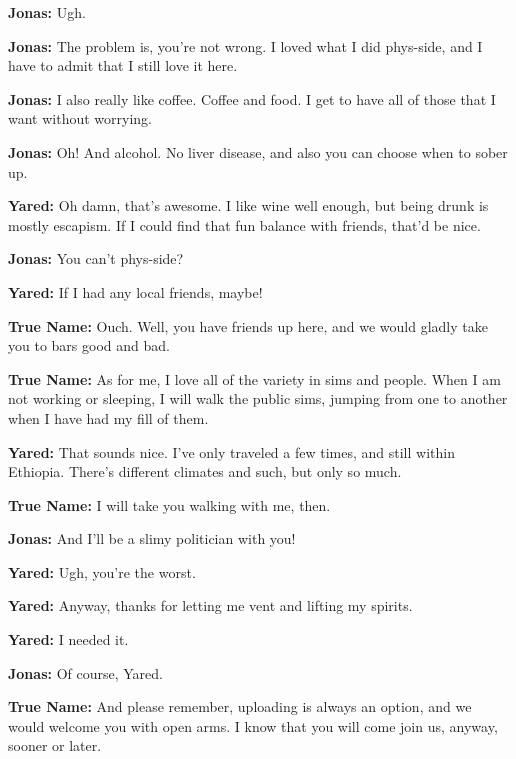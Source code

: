 \textbf{Jonas:} Ugh.

\textbf{Jonas:} The problem is, you're not wrong. I loved what I did phys-side, and I have to admit that I still love it here.

\textbf{Jonas:} I also really like coffee. Coffee and food. I get to have all of those that I want without worrying.

\textbf{Jonas:} Oh! And alcohol. No liver disease, and also you can choose when to sober up.

\textbf{Yared:} Oh damn, that's awesome. I like wine well enough, but being drunk is mostly escapism. If I could find that fun balance with friends, that'd be nice.

\textbf{Jonas:} You can't phys-side?

\textbf{Yared:} If I had any local friends, maybe!

\textbf{True Name:} Ouch. Well, you have friends up here, and we would gladly take you to bars good and bad.

\textbf{True Name:} As for me, I love all of the variety in sims and people. When I am not working or sleeping, I will walk the public sims, jumping from one to another when I have had my fill of them.

\textbf{Yared:} That sounds nice. I've only traveled a few times, and still within Ethiopia. There's different climates and such, but only so much.

\textbf{True Name:} I will take you walking with me, then.

\textbf{Jonas:} And I'll be a slimy politician with you!

\textbf{Yared:} Ugh, you're the worst.

\textbf{Yared:} Anyway, thanks for letting me vent and lifting my spirits.

\textbf{Yared:} I needed it.

\textbf{Jonas:} Of course, Yared.

\textbf{True Name:} And please remember, uploading is always an option, and we would welcome you with open arms. I know that you will come join us, anyway, sooner or later.
